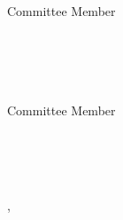 \begin{flushright}
        \vspace{1cm}
        \underline{\hspace{8cm}}  \\
        \MakeUppercase{\secondAdvisorName} \\
        \secondAdvisorSchoolName \\
        \secondAdvisorSchoolPlace \\
        Committee Member \\
\end{flushright}

\begin{flushright}
        \vspace{1cm} 
        \underline{\hspace{8cm}} \\
        \MakeUppercase{\thirdAdvisorName} \\
        \thirdAdvisorSchoolName \\
        \thirdAdvisorSchoolPlace \\
        Committee Member \\
\end{flushright}

\begin{center}
        \vspace{1cm}
        \underline{\hspace{8cm}} \\
        \MakeUppercase{\programDirectorName} \\
        \programDirectorRole \\
        \schoolDepartment
\end{center}

\null
\vfill

\begin{center}
    \textbf{\schoolPlace}, \textbf{\thesisDate} 
\end{center}





